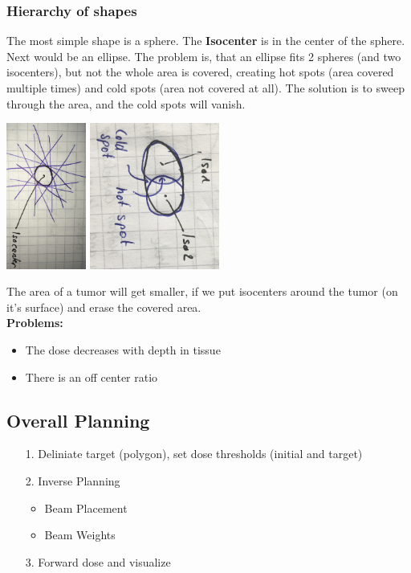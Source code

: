 \documentclass{exerciseBlue}
\begin{document}
\subsubsection{Hierarchy of shapes}
The most simple shape is a sphere. The \textbf{Isocenter} is in the center of the sphere.\\
Next would be an ellipse. The problem is, that an ellipse fits 2 spheres (and two isocenters), but not the whole area is covered, creating hot spots (area covered multiple times) and cold spots (area not covered at all). The solution is to sweep through the area, and the cold spots will vanish.\\
\begin{center}
	\includegraphics[height = 4.8cm]{Images/Isocenter}
	\includegraphics[height = 4.8cm]{Images/Ellipse}
\end{center}
The area of a tumor will get smaller, if we put isocenters around the tumor (on it's surface) and erase the covered area.\\
\textbf{Problems:} \begin{itemize}
	\item The dose decreases with depth in tissue
	\item There is an off center ratio
\end{itemize} 
\subsection{Overall Planning}
\begin{enumerate}
	\item[1.] Deliniate target (polygon), set dose thresholds (initial and target)
	\item[2.] Inverse Planning \begin{itemize}
		\item Beam Placement
		\item Beam Weights
	\end{itemize}
\item[3.] Forward dose and visualize
\end{enumerate}
\newpage
\end{document}
